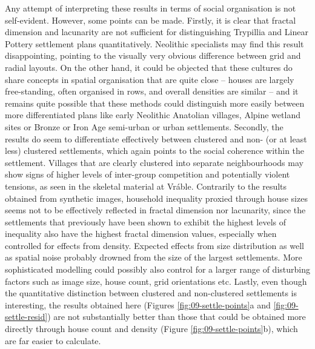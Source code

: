 \documentclass[
  12pt,
  a4paper, twoside]{book}
\begin{document}
Any attempt of interpreting these results in terms of social organisation is not self-evident. However, some points can be made. Firstly, it is clear that fractal dimension and lacunarity are not sufficient for distinguishing Trypillia and Linear Pottery settlement plans quantitatively. Neolithic specialists may find this result disappointing, pointing to the visually very obvious difference between grid and radial layouts. On the other hand, it could be objected that these cultures do share concepts in spatial organisation that are quite close -- houses are largely free-standing, often organised in rows, and overall densities are similar -- and it remains quite possible that these methods could distinguish more easily between more differentiated plans like early Neolithic Anatolian villages, Alpine wetland sites or Bronze or Iron Age semi-urban or urban settlements. Secondly, the results do seem to differentiate effectively between clustered and non- (or at least less) clustered settlements, which again points to the social coherence within the settlement. Villages that are clearly clustered into separate neighbourhoods may show signs of higher levels of inter-group competition and potentially violent tensions, as seen in the skeletal material at Vráble. Contrarily to the results obtained from synthetic images, household inequality proxied through house sizes seems not to be effectively reflected in fractal dimension nor lacunarity, since the settlements that previously have been shown to exhibit the highest levels of inequality also have the highest fractal dimension values, especially when controlled for effects from density. Expected effects from size distribution as well as spatial noise probably drowned from the size of the largest settlements. More sophisticated modelling could possibly also control for a larger range of disturbing factors such as image size, house count, grid orientations etc. Lastly, even though the quantitative distinction between clustered and non-clustered settlements is interesting, the results obtained here (Figures \ref{fig:09-settle-points}a and \ref{fig:09-settle-resid}) are not substantially better than those that could be obtained more directly through house count and density (Figure \ref{fig:09-settle-points}b), which are far easier to calculate.
\end{document}
